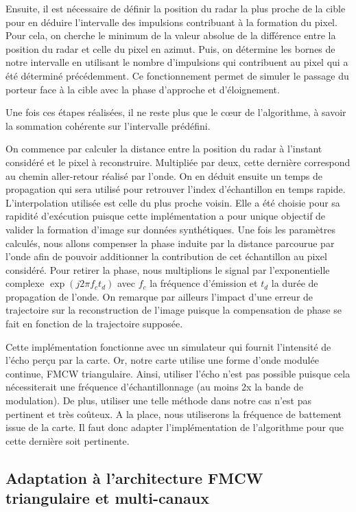 Ensuite, il est nécessaire de définir la position du radar la plus proche de la cible pour en déduire l'intervalle des impulsions contribuant à la formation du pixel. Pour cela, on cherche le minimum de la valeur absolue de la différence entre la position du radar et celle du pixel en azimut. Puis, on détermine les bornes de notre intervalle en utilisant le nombre d'impulsions qui contribuent au pixel qui a été déterminé précédemment. Ce fonctionnement permet de simuler le passage du porteur face à la cible avec la phase d'approche et d'éloignement.

Une fois ces étapes réalisées, il ne reste plus que le cœur de l'algorithme, à savoir la sommation cohérente sur l'intervalle prédéfini. 

On commence par calculer la distance entre la position du radar à l'instant considéré et le pixel à reconstruire. Multipliée par deux, cette dernière correspond au chemin aller-retour réalisé par l'onde. On en déduit ensuite un temps de propagation qui sera utilisé pour retrouver l'index d'échantillon en temps rapide. L'interpolation utilisée est celle du plus proche voisin. Elle a été choisie pour sa rapidité d'exécution puisque cette implémentation a pour unique objectif de valider la formation d'image sur données synthétiques. Une fois les paramètres calculés, nous allons compenser la phase induite par la distance parcourue par l'onde afin de pouvoir additionner la contribution de cet échantillon au pixel considéré. Pour retirer la phase, nous multiplions le signal par l'exponentielle complexe $\exp(j2\pi f_c t_d)$ avec $f_c$ la fréquence d'émission et $t_d$ la durée de propagation de l'onde. On remarque par ailleurs l'impact d'une erreur de trajectoire sur la reconstruction de l'image puisque la compensation de phase se fait en fonction de la trajectoire supposée. 

Cette implémentation fonctionne avec un simulateur qui fournit l'intensité de l'écho perçu par la carte. Or, notre carte utilise une forme d'onde modulée continue, FMCW triangulaire. Ainsi, utiliser l'écho n'est pas possible puisque cela nécessiterait une fréquence d'échantillonnage (au moins 2x la bande de modulation). De plus, utiliser une telle méthode dans notre cas n'est pas pertinent et très coûteux. A la place, nous utiliserons la fréquence de battement issue de la carte. Il faut donc adapter l'implémentation de l'algorithme pour que cette dernière soit pertinente.

\subsection{Adaptation à l'architecture FMCW triangulaire et multi-canaux}\label{subsec:adapt_bp}

